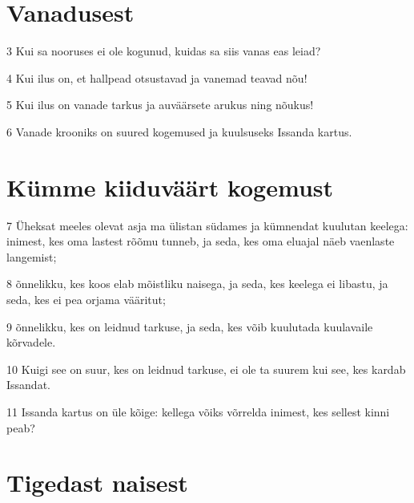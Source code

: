 \section*{Vanadusest}

\par 3 Kui sa nooruses ei ole kogunud, kuidas sa siis vanas eas leiad?
\par 4 Kui ilus on, et hallpead otsustavad ja vanemad teavad nõu!
\par 5 Kui ilus on vanade tarkus ja auväärsete arukus ning nõukus!
\par 6 Vanade krooniks on suured kogemused ja kuulsuseks Issanda kartus.

\section*{Kümme kiiduväärt kogemust}

\par 7 Üheksat meeles olevat asja ma ülistan südames ja kümnendat kuulutan keelega: inimest, kes oma lastest rõõmu tunneb, ja seda, kes oma eluajal näeb vaenlaste langemist;
\par 8 õnnelikku, kes koos elab mõistliku naisega, ja seda, kes keelega ei libastu, ja seda, kes ei pea orjama vääritut;
\par 9 õnnelikku, kes on leidnud tarkuse, ja seda, kes võib kuulutada kuulavaile kõrvadele.
\par 10 Kuigi see on suur, kes on leidnud tarkuse, ei ole ta suurem kui see, kes kardab Issandat.
\par 11 Issanda kartus on üle kõige: kellega võiks võrrelda inimest, kes sellest kinni peab?

\section*{Tigedast naisest}

